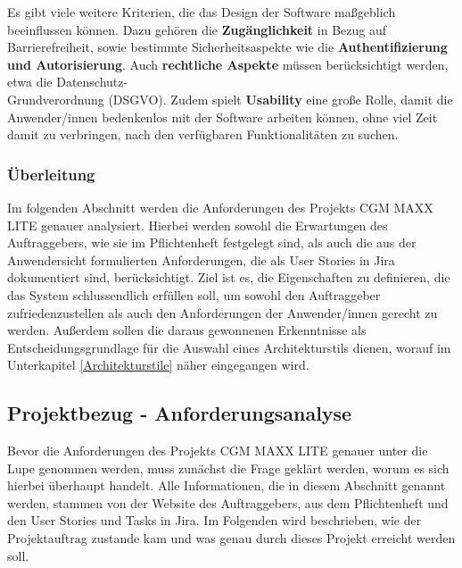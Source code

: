     Es gibt viele weitere Kriterien, die das Design der Software maßgeblich beeinflussen können.
    Dazu gehören die \textbf{Zugänglichkeit} in Bezug auf Barrierefreiheit, sowie bestimmte Sicherheitsaspekte wie die \textbf{Authentifizierung und Autorisierung}.
    Auch \textbf{rechtliche Aspekte} müssen berücksichtigt werden, etwa die Datenschutz-\\Grundverordnung (DSGVO).
    Zudem spielt \textbf{Usability} eine große Rolle, damit die Anwender/innen bedenkenlos mit der Software arbeiten können, ohne viel Zeit damit zu verbringen, nach den verfügbaren Funktionalitäten zu suchen. \\
    \cite[S. 60]{EA:Book02}
    
    
    
    \subsubsection{Überleitung}
    
    Im folgenden Abschnitt werden die Anforderungen des Projekts CGM MAXX LITE genauer analysiert.
    Hierbei werden sowohl die Erwartungen des Auftraggebers, wie sie im Pflichtenheft festgelegt sind, als auch die aus der Anwendersicht formulierten Anforderungen, die als User Stories in Jira dokumentiert sind, berücksichtigt.
    Ziel ist es, die Eigenschaften zu definieren, die das System schlussendlich erfüllen soll, um sowohl den Auftraggeber zufriedenzustellen als auch den Anforderungen der Anwender/innen gerecht zu werden.
    Außerdem sollen die daraus gewonnenen Erkenntnisse als Entscheidungsgrundlage für die Auswahl eines Architekturstils dienen, worauf im Unterkapitel \ref{Architekturstile} näher eingegangen wird.
    
    \clearpage



\subsection{Projektbezug - Anforderungsanalyse} \label{Projektbezug - Anforderungsanalyse}

Bevor die Anforderungen des Projekts CGM MAXX LITE genauer unter die Lupe genommen werden, muss zunächst die Frage geklärt werden, worum es sich hierbei überhaupt handelt. Alle Informationen, die in diesem Abschnitt genannt werden, stammen von der Website des Auftraggebers, aus dem Pflichtenheft und den User Stories und Tasks in Jira.
Im Folgenden wird beschrieben, wie der Projektauftrag zustande kam und was genau durch dieses Projekt erreicht werden soll. 


